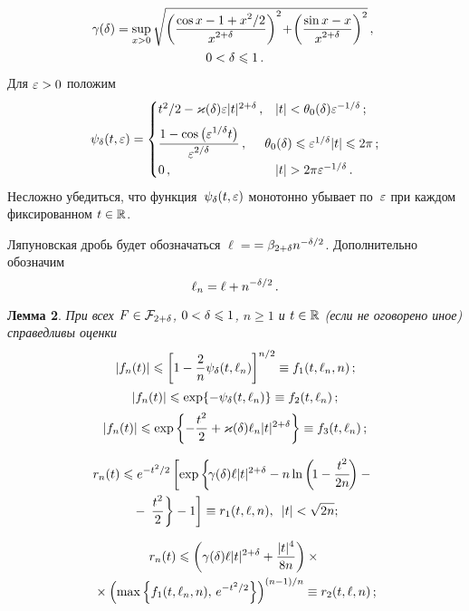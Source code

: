 \begin{multicols}{2}
\noindent
\begin{multline*}
\!\!\gamma(\delta)= \sup_{x>0}\sqrt{\left(\displaystyle\frac{\displaystyle \cos x-1+x^2/2\mathstrut}{\displaystyle x^{2+\delta}\mathstrut}\right)^2\! +\!
\left(\displaystyle\frac{\displaystyle \sin x-x\mathstrut}{\displaystyle x^{2+\delta}\mathstrut}\right)^2 }\,,\\ 0<\delta\leqslant 1\,.
\end{multline*}
Для $\varepsilon>0$ положим
$$
\psi_\d(t,\eps)= 
\begin{cases}
  t^2/2-\kd\eps|t|^{2+\d}\,, & |t|<\theta_0(\d)\eps^{-1/\d}\,;\\[6pt]
  \fr{1-\cos\big(\eps^{1/\d} t\big)}{\eps^{2/\d}}\,,
      &\!\!\!\!\! \theta_0(\d)\le\eps^{1/\d}|t|\le 2\pi\,;\\[6pt]
  0\,, & |t|>2\pi\eps^{-1/\d}\,.
\end{cases}
$$
Несложно убедиться, что функция~$\psi_\delta(t,\varepsilon)$ монотонно убывает 
по~$\varepsilon$ при каждом фиксированном $t\in\mathbb R$.

Ляпуновская дробь будет обозначаться $\ell=$\linebreak $=\beta_{2+\delta} n^{-\delta/2}$.
Дополнительно обозначим
$$
\ell_n=\ell+n^{-\delta/2}\,.
$$

\smallskip

\noindent
\textbf{Лемма 2}.
\textit{При всех $F\in{\mathcal F}_{2+\delta}$, $0<\delta\leqslant1$, $n\ge1$ и $t\in\mathbb R$ (если не
оговорено иное) справедливы оценки}
$$
|f_n(t)|\leqslant  \left[1-\displaystyle\frac{\displaystyle 2\mathstrut}{\displaystyle n\mathstrut}\psi_\delta(t,\ell_n)\right]^{n/2} \equiv
f_1(t,\ell_n,n)\,;
$$
$$
|f_n(t)|\leqslant \exp\{-\psi_\delta(t,\ell_n)\}\equiv  f_2(t,\ell_n)\,;
$$
$$
|f_n(t)|\leqslant \exp\left\{-\displaystyle\frac{\displaystyle t^2\mathstrut}{\displaystyle 2\mathstrut}+\varkappa(\delta)\ell_n|t|^{2+\delta} \right\}\equiv
f_3(t,\ell_n)\,;
$$

\vspace*{-6pt}

\noindent
\begin{multline*}
\!r_n(t)\leqslant e^{-t^2/2}\left[\exp\left\{\! \gamma(\delta)\ell|t|^{2+\delta}-
n\ln\left(\!1-\displaystyle\frac{\displaystyle t^2\mathstrut}{\displaystyle 2n\mathstrut}\!\right)-{}\right.\right.\hspace*{-0.67pt}\\
{}-\left.\left. \displaystyle\frac{\displaystyle t^2\mathstrut}{\displaystyle 2\mathstrut}\right\}-1\right]\equiv
r_1(t,\ell,n), \enskip |t|<\sqrt{2n};
\end{multline*}

\vspace*{-9pt}

\noindent
\begin{multline*}
r_n(t)\leqslant  \left(\gamma(\delta){\ell|t|^{2+\delta}}+\displaystyle\frac{\displaystyle |t|^4\mathstrut}{\displaystyle 8n\mathstrut}\right)
\times{}\\
{}\times 
\left(\max\left\{f_1(t,\ell_n,n),\,e^{-t^2/2}\right\}\right)^{(n-1)/n}
\equiv r_2(t,\ell,n)\,;
\end{multline*}


\end{multicols}
